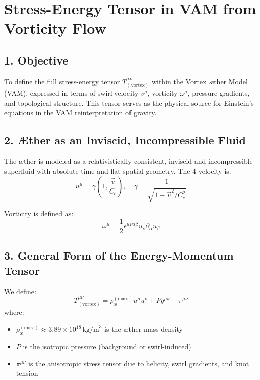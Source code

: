 \documentclass[twocolumn,aps,pre,floatfix,nofootinbib]{revtex4-2}
\begin{document}
    \section*{Stress-Energy Tensor in VAM from Vorticity Flow}

    \subsection*{1. Objective}

    To define the full stress-energy tensor \( T^{\mu\nu}_{(\text{vortex})} \) within the Vortex \textit{\ae}ther Model (VAM), expressed in terms of swirl velocity \( v^\mu \), vorticity \( \omega^\mu \), pressure gradients, and topological structure. This tensor serves as the physical source for Einstein’s equations in the VAM reinterpretation of gravity.

    \subsection*{2. Æther as an Inviscid, Incompressible Fluid}

    The æther is modeled as a relativistically consistent, inviscid and incompressible superfluid with absolute time and flat spatial geometry. The 4-velocity is:
    \begin{equation}
        u^\mu = \gamma \left(1, \frac{\vec{v}}{C_e} \right), \quad \gamma = \frac{1}{\sqrt{1 - \vec{v}^2 / C_e^2}}
    \end{equation}

    Vorticity is defined as:
    \begin{equation}
        \omega^\mu = \frac{1}{2} \epsilon^{\mu\nu\alpha\beta} u_\nu \partial_\alpha u_\beta
    \end{equation}

    \subsection*{3. General Form of the Energy-Momentum Tensor}

    We define:
    \begin{equation}
        T^{\mu\nu}_{(\text{vortex})} = \rho_{\text{\ae}}^{(\text{mass})} u^\mu u^\nu + P g^{\mu\nu} + \pi^{\mu\nu}
    \end{equation}
    where:
    \begin{itemize}
        \item \( \rho_{\text{\ae}}^{(\text{mass})} \approx 3.89 \times 10^{18} \, \text{kg/m}^3 \) is the æther mass density \cite{Iskandarani2025b}
        \item \( P \) is the isotropic pressure (background or swirl-induced)
        \item \( \pi^{\mu\nu} \) is the anisotropic stress tensor due to helicity, swirl gradients, and knot tension
    \end{itemize}
\end{document}
